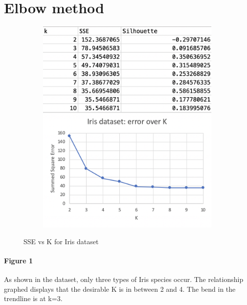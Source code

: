 \documentclass{article}
\begin{document}
\section{Elbow method}

\begin{figure}[h!]
  \centering
  \begin{subfigure}[b]{.6\linewidth}
    \includegraphics[width=\linewidth]{one.jpg}
  \end{subfigure}
  \caption{SSE vs K for Iris dataset }

  \end{figure}
      \paragraph{Figure 1}
As shown in the dataset, only three types of Iris species occur. The relationship graphed displays that the desirable K is in between 2 and 4. The bend in the trendline is at k=3.
    \newpage
\end{document}
